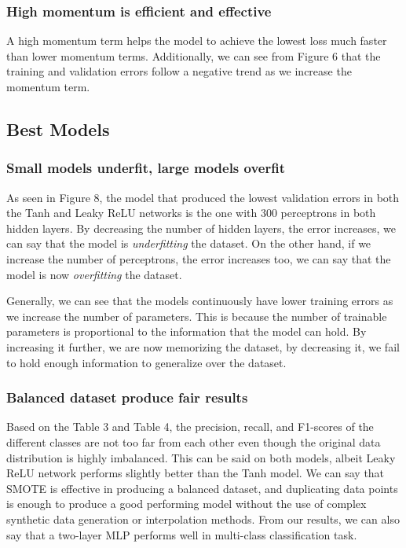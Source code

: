 \documentclass{acm_proc_article-sp}
\begin{document}
\subsubsection{High momentum is efficient and effective}
A high momentum term helps the model to achieve the lowest loss much faster than lower momentum terms. Additionally, we can see from Figure 6 that the training and validation errors follow a negative trend as we increase the momentum term.

\subsection{Best Models}
\subsubsection{Small models underfit, large models overfit}
As seen in Figure 8, the model that produced the lowest validation errors in both the Tanh and Leaky ReLU networks is the one with 300 perceptrons in both hidden layers. By decreasing the number of hidden layers, the error increases, we can say that the model is \textit{underfitting} the dataset. On the other hand, if we increase the number of perceptrons, the error increases too, we can say that the model is now \textit{overfitting} the dataset. 

Generally, we can see that the models continuously have lower training errors as we increase the number of parameters. This is because the number of trainable parameters is proportional to the information that the model can hold. By increasing it further, we are now memorizing the dataset, by decreasing it, we fail to hold enough information to generalize over the dataset.

\subsubsection{Balanced dataset produce fair results}
Based on the Table 3 and Table 4, the precision, recall, and F1-scores of the different classes are not too far from each other even though the original data distribution is highly imbalanced. This can be said on both models, albeit Leaky ReLU network performs slightly better than the Tanh model. We can say that SMOTE is effective in producing a balanced dataset, and duplicating data points is enough to produce a good performing model without the use of complex synthetic data generation or interpolation methods. From our results, we can also say that a two-layer MLP performs well in multi-class classification task.
\end{document}
